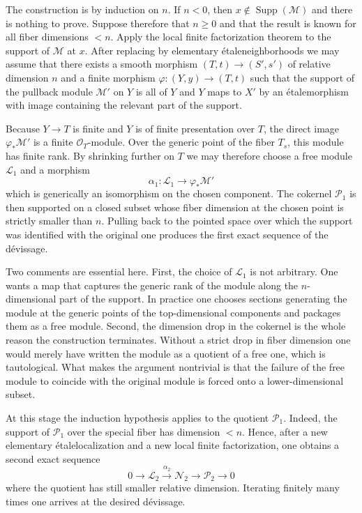 \documentclass[11pt,oneside]{article}
\newcommand{\Lcal}{\mathcal L}
\newcommand{\M}{\mathcal M}
\newcommand{\N}{\mathcal N}
\newcommand{\Pcal}{\mathcal P}
\newcommand{\OO}{\mathcal O}
\newcommand{\Supp}{\operatorname{Supp}}
\newcommand{\etale}{\'etale}
\begin{document}
The construction is by induction on $n$.  If $n<0$, then $x\notin\Supp(\M)$ and there is nothing to prove.  Suppose therefore that $n\ge 0$ and that the result is known for all fiber dimensions $<n$.  Apply the local finite factorization theorem to the support of $\M$ at $x$.  After replacing by elementary \etale neighborhoods we may assume that there exists a smooth morphism $(T,t)\to (S',s')$ of relative dimension $n$ and a finite morphism $\varphi\colon (Y,y)\to (T,t)$ such that the support of the pullback module $\M'$ on $Y$ is all of $Y$ and $Y$ maps to $X'$ by an \etale morphism with image containing the relevant part of the support.

Because $Y\to T$ is finite and $Y$ is of finite presentation over $T$, the direct image $\varphi_*\M'$ is a finite $\OO_T$-module.  Over the generic point of the fiber $T_s$, this module has finite rank.  By shrinking further on $T$ we may therefore choose a free module $\Lcal_1$ and a morphism
\[
\alpha_1\colon \Lcal_1\to \varphi_*\M'
\]
which is generically an isomorphism on the chosen component.  The cokernel $\Pcal_1$ is then supported on a closed subset whose fiber dimension at the chosen point is strictly smaller than $n$.  Pulling back to the pointed space over which the support was identified with the original one produces the first exact sequence of the d\'evissage.

Two comments are essential here.  First, the choice of $\Lcal_1$ is not arbitrary.  One wants a map that captures the generic rank of the module along the $n$-dimensional part of the support.  In practice one chooses sections generating the module at the generic points of the top-dimensional components and packages them as a free module.  Second, the dimension drop in the cokernel is the whole reason the construction terminates.  Without a strict drop in fiber dimension one would merely have written the module as a quotient of a free one, which is tautological.  What makes the argument nontrivial is that the failure of the free module to coincide with the original module is forced onto a lower-dimensional subset.

At this stage the induction hypothesis applies to the quotient $\Pcal_1$.  Indeed, the support of $\Pcal_1$ over the special fiber has dimension $<n$.  Hence, after a new elementary \etale localization and a new local finite factorization, one obtains a second exact sequence
\[
0\to \Lcal_2\xrightarrow{\alpha_2}\N_2\to \Pcal_2\to 0
\]
where the quotient has still smaller relative dimension.  Iterating finitely many times one arrives at the desired d\'evissage.
\end{document}
